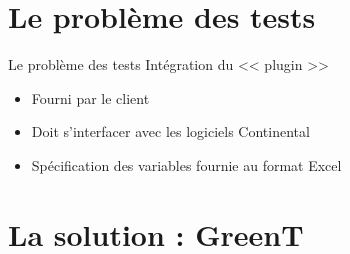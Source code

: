 \documentclass{beamer}
\begin{document}
\section{Le probl\`eme des tests}
\begin{frame}{Le problème des tests}
	Intégration du << plugin >>
	\vspace{-10px}
			\begin{itemize}[<+->]
				\item Fourni par le client
				\item Doit s'interfacer avec les logiciels Continental 
				\item Spécification des variables fournie au format Excel
			\end{itemize}
\end{frame}

\section{La solution : GreenT}
\end{document}
